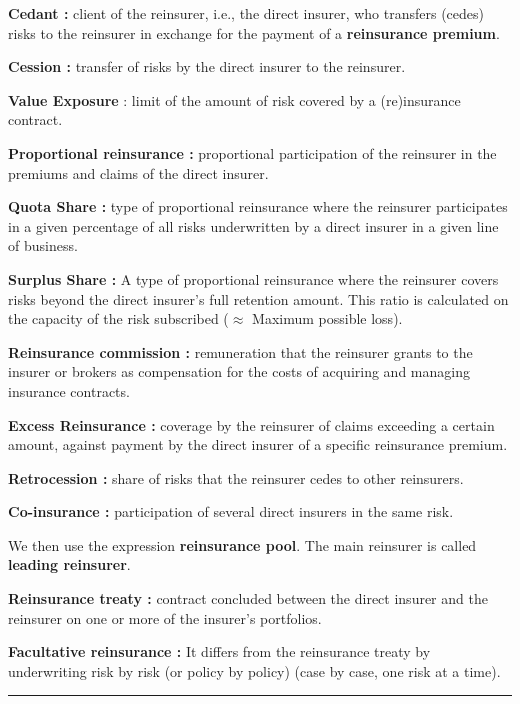 
\begin{f}

\textbf{Cedant :} client of the reinsurer, i.e., the direct insurer, who transfers (cedes) risks to the reinsurer in exchange for the payment
of a \textbf{reinsurance premium}.

\textbf{Cession :} transfer of risks by the direct insurer to the reinsurer.

\textbf{Value Exposure} : limit of the amount of risk covered by a (re)insurance contract.

\textbf{Proportional reinsurance :} proportional participation of the reinsurer in the premiums and claims of the direct insurer.

\textbf{Quota Share :} type of proportional reinsurance where the reinsurer participates in a given percentage of all risks underwritten by a direct insurer in a given line of business.

\textbf{Surplus Share :} A type of proportional reinsurance where the reinsurer covers risks beyond the direct insurer's 
full retention amount. This ratio is calculated on the capacity of the risk subscribed ($\approx$ Maximum possible loss).

\textbf{Reinsurance commission :} remuneration that the reinsurer grants to the insurer or brokers as compensation for the costs of acquiring and managing insurance contracts.

\textbf{Excess Reinsurance :}
 coverage by the reinsurer of claims exceeding a certain amount, against payment by the direct insurer of a specific reinsurance premium.

\textbf{Retrocession :}  share of risks that the reinsurer cedes to other reinsurers.

\textbf{Co-insurance :} participation of several direct insurers in the same risk.

We then use the expression \textbf{reinsurance pool}.
The main reinsurer is called \textbf{leading reinsurer}.

\textbf{Reinsurance treaty :} contract concluded between the direct insurer and the reinsurer on one or more of the insurer's portfolios.

\textbf{Facultative reinsurance :}
It differs from the reinsurance treaty by underwriting risk by risk (or policy by policy) (case by case, one risk at a time).

\end{f}
\hrule




